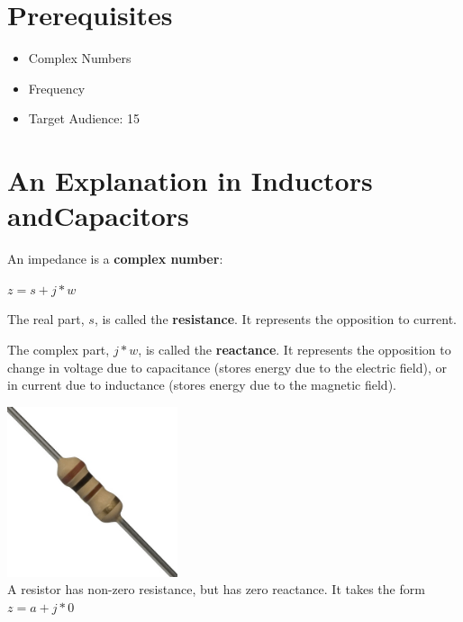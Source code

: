 \documentclass[12pt]{article}
\begin{document}
\maketitle

\section{Prerequisites}
\begin{itemize}
\item Complex Numbers
\item Frequency
\item Target Audience: 15
\end{itemize}


\section{An Explanation in Inductors and\newline Capacitors}

An impedance is a \textbf{complex number}:\\
\begin{center}
$z = s+j*w$
\end{center}

The real part, $s$, is called the \textbf{resistance}. It represents the opposition to current.

The complex part, $j*w$, is called the \textbf{reactance}. It represents the opposition to change in voltage due to capacitance (stores energy due to the electric field), or in current due to inductance (stores energy due to the magnetic field). \\
\begin{center}
\includegraphics[height=50mm, width=50mm]{resistor.jpg}\\
A resistor has non-zero resistance, but has zero reactance. It takes the form\\

$z = a + j*0$\\
\end{center}
\end{document}
